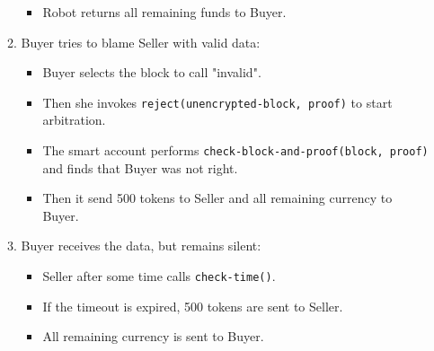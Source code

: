 \begin{itemize}
\begin{enumerate}
\begin{itemize}
        \item Robot returns all remaining funds to Buyer.
      \end{itemize}
    \item Buyer tries to blame Seller with valid data:
      \begin{itemize}
        \item Buyer selects the block to call "invalid".

        \item Then she invokes \verb|reject(unencrypted-block, proof)| to start arbitration.

        \item The smart account performs \verb|check-block-and-proof(block, proof)| and finds that Buyer was not right.

        \item Then it send 500 tokens to Seller and all remaining currency to Buyer.
      \end{itemize}
    \item Buyer receives the data, but remains silent:
      \begin{itemize}
        \item Seller after some time calls \verb|check-time()|.

        \item If the timeout is expired, 500 tokens are sent to Seller.

        \item All remaining currency is sent to Buyer.
      \end{itemize}
  \end{enumerate}

\end{itemize}
